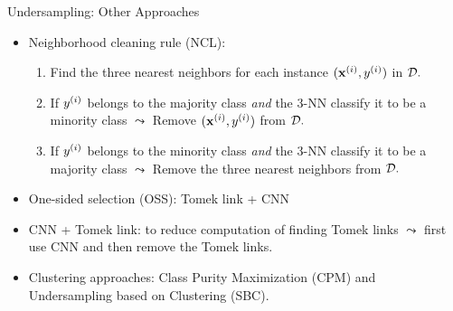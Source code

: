 \documentclass[11pt,compress,t,notes=noshow, xcolor=table]{beamer}
\begin{document}
	\begin{frame}{Undersampling: Other Approaches}

		\footnotesize
		\begin{itemize}
	
			\item Neighborhood cleaning rule (NCL):
		
			\begin{enumerate} \footnotesize
				
				\item Find the three nearest neighbors for each instance $(\mathbf{x}^{(i)},y^{(i)})$ in $\mathcal{D}.$
                \vspace{5pt}
			
				\item If $y^{(i)}$ belongs to the majority class \emph{and} the 3-NN classify it to be a minority class $\leadsto$ Remove $(\mathbf{x}^{(i)},y^{(i)})$ from $\mathcal{D}.$
                \vspace{5pt}
			
				\item If $y^{(i)}$ belongs to the minority class \emph{and} the 3-NN classify it to be a majority class $\leadsto$ Remove the three nearest neighbors from $\mathcal{D}.$
                \vspace{5pt}
			
			\end{enumerate} 
            \vspace{10pt}
		
			\item One-sided selection (OSS): Tomek link + CNN
            \vspace{10pt}
	
			\item CNN + Tomek link: to reduce computation of finding Tomek links $\leadsto$ first use CNN and then remove the Tomek links.
            \vspace{10pt}
		
			\item Clustering approaches: Class Purity Maximization (CPM) and Undersampling based on Clustering (SBC).

		\end{itemize}

	\end{frame}
	
\end{document}
